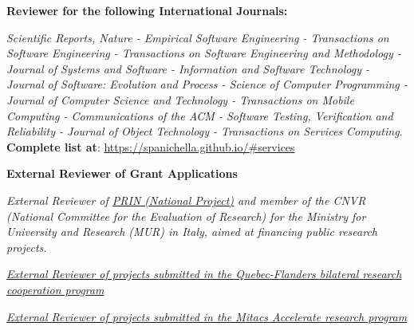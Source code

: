 \documentclass[11pt]{article}
\begin{document}


\textbf{Reviewer for the following International Journals:}
\begin{innerlist}
\item \emph{Scientific Reports, Nature - Empirical Software Engineering - Transactions on Software Engineering - Transactions on Software Engineering and Methodology - Journal of Systems and Software - Information and Software Technology - Journal of Software: Evolution and Process - Science of Computer Programming - Journal of Computer Science and Technology - Transactions on Mobile Computing - Communications of the ACM - Software Testing, Verification and Reliability - Journal of Object Technology - Transactions on Services Computing}.  \textbf{Complete list at}: \href{https://spanichella.github.io/\#services}{https://spanichella.github.io/\#services}
\end{innerlist} 

\medskip 
\textbf{External Reviewer of Grant Applications}
\begin{innerlist}

   \item \emph{External Reviewer of \href{https://prin.mur.gov.it/}
                   {PRIN (National Project)} and member of the CNVR (National Committee for the Evaluation of Research) for the Ministry for University and Research (MUR) in Italy, aimed at financing public research projects. }

   \item \emph{
              \href{http://www.frqnt.gouv.qc.ca/accueil}
                   {External Reviewer of projects submitted in the Quebec-Flanders bilateral research cooperation program}}
\item \emph{
              \href{}
                   {External Reviewer of projects submitted in the Mitacs Accelerate research program\\\\}}
                   
\end{innerlist}
\end{document}
